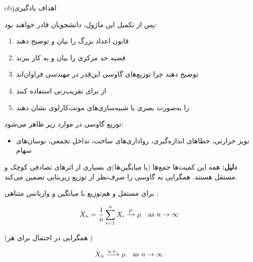 \begin{PSbox}[unbreakable]{obj}{اهداف یادگیری}

پس از تکمیل این ماژول، دانشجویان قادر خواهند بود:

\begin{enumerate}
\def\labelenumi{\arabic{enumi}.}
\tightlist
\item
  قانون اعداد بزرگ را بیان و توضیح دهند
\item
  قضیه حد مرکزی را بیان و به کار ببرند
\item
  توضیح دهند چرا توزیع‌های گاوسی این‌قدر در مهندسی فراوان‌اند
\item
  از  برای تقریب‌زنی استفاده کنند
\item
   را به‌صورت بصری با شبیه‌سازی‌های مونت‌کارلوی  نشان دهند
\end{enumerate}

\end{PSbox}


توزیع گاوسی در موارد زیر ظاهر می‌شود:

\begin{itemize}
\tightlist
\item
  نویز حرارتی، خطاهای اندازه‌گیری، رواداری‌های ساخت، تداخل تجمعی، نوسان‌های سهام
\end{itemize}

\textbf{دلیل:} همه این کمیت‌ها جمع‌ها (یا میانگین‌ها)ی بسیاری از اثرهای تصادفی کوچک و مستقل هستند.  همگرایی به گاوسی را صرف‌نظر از توزیع زیربنایی تضمین می‌کند.



برای  مستقل و هم‌توزیع  با میانگین \lr{\ensuremath{\mu}} و واریانس متناهی :

\[\bar{X}_n = \frac{1}{n}\sum_{i=1}^n X_i \xrightarrow{P} \mu \quad \text{as } n \to \infty\]

(همگرایی در احتمال برای هر )


\[\bar{X}_n \xrightarrow{a.s.} \mu \quad \text{as } n \to \infty\]

